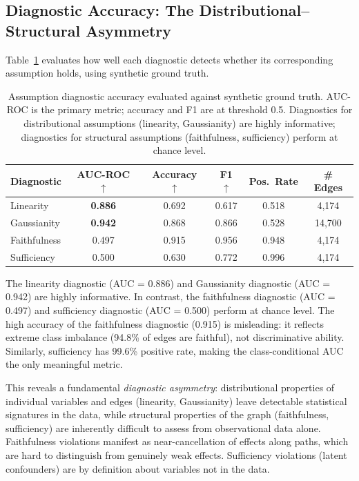 \documentclass{article}
\begin{document}
\subsection{Diagnostic Accuracy: The Distributional--Structural Asymmetry}
\label{sec:diagnostic_accuracy}

Table~\ref{tab:assumption} evaluates how well each diagnostic detects whether its corresponding assumption holds, using synthetic ground truth.

\begin{table}[t]
\caption{Assumption diagnostic accuracy evaluated against synthetic ground truth. AUC-ROC is the primary metric; accuracy and F1 are at threshold 0.5. Diagnostics for distributional assumptions (linearity, Gaussianity) are highly informative; diagnostics for structural assumptions (faithfulness, sufficiency) perform at chance level.}
\label{tab:assumption}
\centering
\begin{tabular}{lccccc}
\toprule
Diagnostic & AUC-ROC $\uparrow$ & Accuracy $\uparrow$ & F1 $\uparrow$ & Pos.\ Rate & \# Edges \\
\midrule
Linearity & \textbf{0.886} & 0.692 & 0.617 & 0.518 & 4,174 \\
Gaussianity & \textbf{0.942} & 0.868 & 0.866 & 0.528 & 14,700 \\
Faithfulness & 0.497 & 0.915 & 0.956 & 0.948 & 4,174 \\
Sufficiency & 0.500 & 0.630 & 0.772 & 0.996 & 4,174 \\
\bottomrule
\end{tabular}
\end{table}

The linearity diagnostic (AUC = 0.886) and Gaussianity diagnostic (AUC = 0.942) are highly informative.
In contrast, the faithfulness diagnostic (AUC = 0.497) and sufficiency diagnostic (AUC = 0.500) perform at chance level.
The high accuracy of the faithfulness diagnostic (0.915) is misleading: it reflects extreme class imbalance (94.8\% of edges are faithful), not discriminative ability.
Similarly, sufficiency has 99.6\% positive rate, making the class-conditional AUC the only meaningful metric.

This reveals a fundamental \emph{diagnostic asymmetry}: distributional properties of individual variables and edges (linearity, Gaussianity) leave detectable statistical signatures in the data, while structural properties of the graph (faithfulness, sufficiency) are inherently difficult to assess from observational data alone.
Faithfulness violations manifest as near-cancellation of effects along paths, which are hard to distinguish from genuinely weak effects.
Sufficiency violations (latent confounders) are by definition about variables not in the data.
\end{document}

